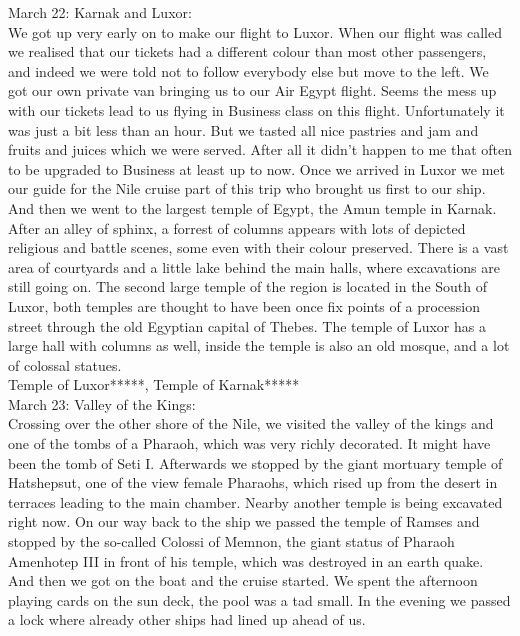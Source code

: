 March 22: Karnak and Luxor:\\
We got up very early on to make our flight to Luxor. When our flight was called we realised that our tickets had a different colour than most other passengers, and indeed we were told not to follow everybody else but move to the left. We got our own private van bringing us to our Air Egypt flight. Seems the mess up with our tickets lead to us flying in Business class on this flight. Unfortunately it was just a bit less than an hour. But we tasted all nice pastries and jam and fruits and juices which we were served. After all it didn't happen to me that often to be upgraded to Business at least up to now. Once we arrived in Luxor we met our guide for the Nile cruise part of this trip who brought us first to our ship. And then we went to the largest temple of Egypt, the Amun temple in Karnak. After an alley of sphinx, a forrest of columns appears with lots of depicted religious and battle scenes, some even with their colour preserved. There is a vast area of courtyards and a little lake behind the main halls, where excavations are still going on. The second large temple of the region is located in the South of Luxor, both temples are thought to have been once fix points of a procession street through the old Egyptian capital of Thebes. The temple of Luxor has a large hall with columns as well, inside the temple is also an old mosque, and a lot of colossal statues.\\

Temple of Luxor*****, Temple of Karnak*****\\

March 23: Valley of the Kings:\\
Crossing over the other shore of the Nile, we visited the valley of the kings and one of the tombs of a Pharaoh, which was very richly decorated. It might have been the tomb of Seti I. Afterwards we stopped by the giant mortuary temple of Hatshepsut, one of the view female Pharaohs, which rised up from the desert in terraces leading to the main chamber. Nearby another temple is being excavated right now. On our way back to the ship we passed the temple of Ramses and stopped by the so-called Colossi of Memnon, the giant status of Pharaoh Amenhotep III in front of his temple, which was destroyed in an earth quake. And then we got on the boat and the cruise started. We spent the afternoon playing cards on the sun deck, the pool was a tad small. In the evening we passed a lock where already other ships had lined up ahead of us.\\
  
